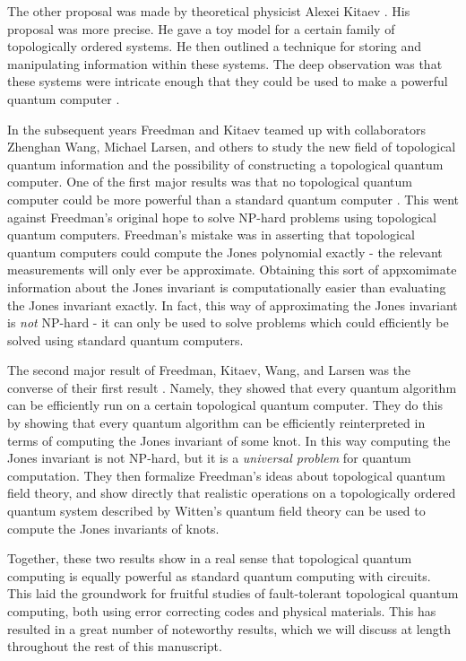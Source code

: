 The other proposal was made by theoretical physicist Alexei Kitaev \cite{kitaev2003fault}. His proposal was more precise. He gave a toy model for a certain family of topologically ordered systems. He then outlined a technique for storing and manipulating information within these systems. The deep observation was that these systems were intricate enough that they could be used to make a powerful quantum computer \cite{mochon2003anyons}.

In the subsequent years Freedman and Kitaev teamed up with collaborators Zhenghan Wang, Michael Larsen, and others to study the new field of topological quantum information and the possibility of constructing a topological quantum computer. One of the first major results was that no topological quantum computer could be more powerful than a standard quantum computer \cite{freedman2002simulation}. This went against Freedman’s original hope to solve NP-hard problems using topological quantum computers. Freedman’s mistake was in asserting that topological quantum computers could compute the Jones polynomial exactly - the relevant measurements will only ever be approximate. Obtaining this sort of appxomimate information about the Jones invariant is computationally easier than evaluating the Jones invariant exactly. In fact, this way of approximating the Jones invariant is \textit{not} NP-hard - it can only be used to solve problems which could efficiently be solved using standard quantum computers.

The second major result of Freedman, Kitaev, Wang, and Larsen was the converse of their first result \cite{freedman2002modular}. Namely, they showed that every quantum algorithm can be efficiently run on a certain topological quantum computer. They do this by showing that every quantum algorithm can be efficiently reinterpreted in terms of computing the Jones invariant of some knot. In this way computing the Jones invariant is not NP-hard, but it is a {\em universal problem} for quantum computation. They then formalize Freedman’s ideas about topological quantum field theory, and show directly that realistic operations on a topologically ordered quantum system described by Witten’s quantum field theory can be used to compute the Jones invariants of knots.

Together, these two results show in a real sense that topological quantum computing is equally powerful as standard quantum computing with circuits. This laid the groundwork for fruitful studies of fault-tolerant topological quantum computing, both using error correcting codes and physical materials. This has resulted in a great number of noteworthy results, which we will discuss at length throughout the rest of this manuscript.


